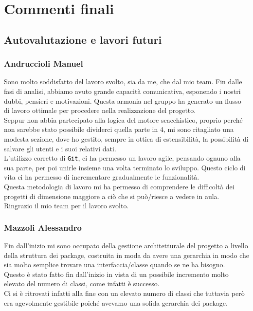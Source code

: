 \documentclass[a4paper,12pt]{report}
\begin{document}
\chapter{Commenti finali}

\section{Autovalutazione e lavori futuri}

\subsection{Andruccioli Manuel}

Sono molto soddisfatto del lavoro svolto, sia da me, che dal mio team. Fin dalle fasi di analisi, abbiamo avuto grande capacità comunicativa, esponendo i nostri dubbi, pensieri e motivazioni. Questa armonia nel gruppo ha generato un flusso di lavoro ottimale per procedere nella realizzazione del progetto.
\\
Seppur non abbia partecipato alla logica del motore scacchistico, proprio perché non sarebbe stato possibile dividerci quella parte in 4, mi sono ritagliato una modesta sezione, dove ho gestito, sempre in ottica di estensibilità, la possibilità di salvare gli utenti e i suoi relativi dati.
\\
L'utilizzo corretto di \texttt{Git}, ci ha permesso un lavoro agile, pensando ognuno alla sua parte, per poi unirle insieme una volta terminato lo sviluppo. Questo ciclo di vita ci ha permesso di incrementare gradualmente le funzionalità.
\\
Questa metodologia di lavoro mi ha permesso di comprendere le difficoltà dei progetti di dimensione maggiore a ciò che si può/riesce a vedere in aula.
\\
Ringrazio il mio team per il lavoro svolto.

\subsection{Mazzoli Alessandro}
Fin dall'inizio mi sono occupato della gestione architetturale del progetto a livello della struttura dei package, costruita in moda da avere una gerarchia in modo che sia molto semplice trovare una interfaccia/classe quando se ne ha bisogno.
\\
Questo è stato fatto fin dall'inizio in vista di un possibile incremento molto elevato del numero di classi, come infatti è successo.
\\
Ci si è ritrovati infatti alla fine con un elevato numero di classi che tuttavia però era agevolmente gestibile poiché avevamo una solida gerarchia dei package.
\end{document}
